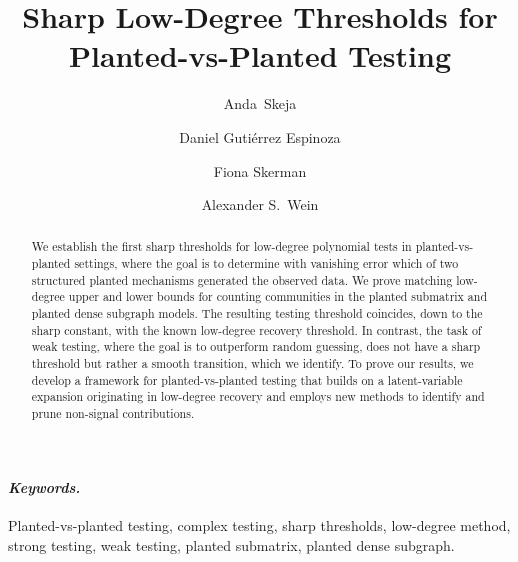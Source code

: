 \documentclass[11pt, letterpaper]{article}
\title{Sharp Low-Degree Thresholds for Planted-vs-Planted Testing}
\date{}
\numberwithin{equation}{section}
\begin{document}
\author[1]{\mbox{Anda Skeja}}
\author[2]{Daniel Gutiérrez Espinoza}
\author[3]{Fiona Skerman}
\author[4]{Alexander S.\ Wein}

\maketitle

\renewcommand{\thefootnote}{}


\renewcommand{\thefootnote}{\arabic{footnote}}
\begin{abstract}%
We establish the first sharp thresholds for low-degree polynomial tests in planted-vs-planted settings, where the goal is to determine with vanishing error which of two structured planted mechanisms generated the observed data. We prove matching low-degree upper and lower bounds for counting communities in the planted submatrix and planted dense subgraph models. The resulting testing threshold coincides, down to the sharp constant, with the known low-degree recovery threshold. In contrast, the task of weak testing, where the goal is to outperform random guessing, does not have a sharp threshold but rather a smooth transition, which we identify.
To prove our results, we develop a framework for planted-vs-planted testing that builds on a latent-variable expansion originating in low-degree recovery and employs new methods to identify and prune non-signal contributions.
\end{abstract}

\paragraph{\emph{Keywords.}}
Planted-vs-planted testing, complex testing, sharp thresholds, low-degree method, strong testing, weak testing, planted submatrix, planted dense subgraph.
\end{document}
